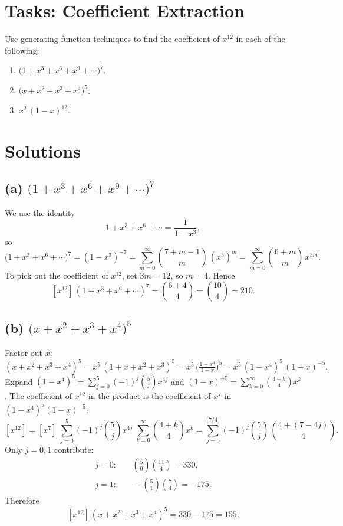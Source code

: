 \documentclass[docmute]{article}
\begin{document}
\section*{Tasks: Coefficient Extraction}

Use generating‐function techniques to find the coefficient of \(x^{12}\) in each of the following:
\begin{enumerate}[label=\textbf{(\alph*)}]
  \item \(\displaystyle\bigl(1 + x^3 + x^6 + x^9 + \cdots\bigr)^7\).
  \item \(\displaystyle\bigl(x + x^2 + x^3 + x^4\bigr)^5\).
  \item \(\displaystyle x^2\,(1 - x)^{12}\).
\end{enumerate}

\section*{Solutions}

\subsection*{(a) \(\bigl(1 + x^3 + x^6 + x^9 + \cdots\bigr)^7\)}
We use the identity
\[
1 + x^3 + x^6 + \cdots = \frac1{1 - x^3},
\]
so
\[
\bigl(1 + x^3 + x^6 + \cdots\bigr)^7
= (1 - x^3)^{-7}
= \sum_{m=0}^\infty \binom{7 + m - 1}{m}\,(x^3)^m
= \sum_{m=0}^\infty \binom{6 + m}{m}\,x^{3m}.
\]
To pick out the coefficient of \(x^{12}\), set \(3m=12\), so \(m=4\). Hence
\[
\boxed{
[x^{12}]\,(1 + x^3 + x^6 + \cdots)^7
= \binom{6+4}{4}
= \binom{10}{4}
=210.
}
\]

\subsection*{(b) \(\bigl(x + x^2 + x^3 + x^4\bigr)^5\)}  
Factor out \(x\):
\[
(x + x^2 + x^3 + x^4)^5
= x^5\,(1 + x + x^2 + x^3)^5
= x^5\,\bigl(\tfrac{1 - x^4}{1 - x}\bigr)^5
= x^5\,(1 - x^4)^5\,(1 - x)^{-5}.
\]
Expand \((1 - x^4)^5=\sum_{j=0}^5(-1)^j\binom{5}{j}x^{4j}\) and \((1 - x)^{-5}=\sum_{k=0}^\infty\binom{4 + k}{4}x^k\).  The coefficient of \(x^{12}\) in the product is the coefficient of \(x^7\) in \((1 - x^4)^5(1 - x)^{-5}\):
\[
[x^{12}]
= [x^7]\;\sum_{j=0}^5(-1)^j\binom{5}{j}x^{4j}
           \;\sum_{k=0}^\infty\binom{4+k}{4}x^k
= \sum_{j=0}^{\lfloor7/4\rfloor}(-1)^j\binom{5}{j}\,
  \binom{4+(7-4j)}{4}.
\]
Only \(j=0,1\) contribute:
\[
\begin{aligned}
j=0:&\quad \binom{5}{0}\binom{11}{4} = 330,\\
j=1:&\quad -\binom{5}{1}\binom{7}{4} = -175.
\end{aligned}
\]
Therefore
\[
\boxed{
[x^{12}]\,(x + x^2 + x^3 + x^4)^5 = 330 - 175 = 155.
}
\]
\end{document}
